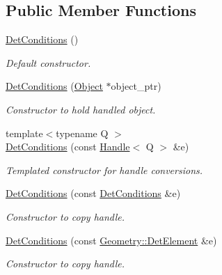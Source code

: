 \subsection*{Public Member Functions}
\begin{DoxyCompactItemize}
\item 
\hyperlink{class_d_d4hep_1_1_conditions_1_1_det_conditions_a9a4cde83aa738c3970fd1cfe2e77f3b0}{DetConditions} ()
\begin{DoxyCompactList}\small\item\em Default constructor. \item\end{DoxyCompactList}\item 
\hyperlink{class_d_d4hep_1_1_conditions_1_1_det_conditions_a54b5cab9b9fca16db159c7f2cf5a4023}{DetConditions} (\hyperlink{class_d_d4hep_1_1_geometry_1_1_det_element_object}{Object} $\ast$object\_\-ptr)
\begin{DoxyCompactList}\small\item\em Constructor to hold handled object. \item\end{DoxyCompactList}\item 
{\footnotesize template$<$typename Q $>$ }\\\hyperlink{class_d_d4hep_1_1_conditions_1_1_det_conditions_ae5a6ac2c8afa92d6f34a8f2a66138728}{DetConditions} (const \hyperlink{class_d_d4hep_1_1_handle}{Handle}$<$ Q $>$ \&e)
\begin{DoxyCompactList}\small\item\em Templated constructor for handle conversions. \item\end{DoxyCompactList}\item 
\hyperlink{class_d_d4hep_1_1_conditions_1_1_det_conditions_a5b72efafc068b87b3ec6eba550353afe}{DetConditions} (const \hyperlink{class_d_d4hep_1_1_conditions_1_1_det_conditions}{DetConditions} \&e)
\begin{DoxyCompactList}\small\item\em Constructor to copy handle. \item\end{DoxyCompactList}\item 
\hyperlink{class_d_d4hep_1_1_conditions_1_1_det_conditions_a48f5f45b8d7896721e3875f0b02e0f9a}{DetConditions} (const \hyperlink{class_d_d4hep_1_1_geometry_1_1_det_element}{Geometry::DetElement} \&e)
\begin{DoxyCompactList}\small\item\em Constructor to copy handle. \item\end{DoxyCompactList}\item 

\end{DoxyCompactItemize}
